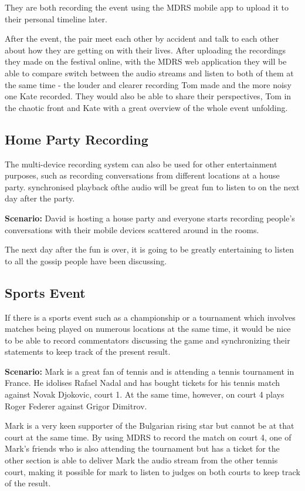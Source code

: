\documentclass{l3proj}
\begin{document}
They are both recording the event using the MDRS mobile app to upload it to their personal timeline later.

After the event, the pair meet each other by accident and talk to each other about how they are getting on with their lives. After uploading the recordings they made on the festival online, with the MDRS web application they will be able to compare switch between the audio streams and listen to both of them at the same time - the louder and clearer recording Tom made and the more noisy one Kate recorded. They would also be able to share their perspectives, Tom in the chaotic front and Kate with a great overview of the whole event unfolding.

\subsection{Home Party Recording} The multi-device recording system can also be used for other entertainment purposes, such as recording conversations from different locations at a house party. synchronised playback ofthe audio will be great fun to listen to on the next day after the party.

\textbf{Scenario:} David is hosting a house party and everyone starts recording people's conversations with their mobile devices scattered around in the rooms.

The next day after the fun is over, it is going to be greatly entertaining to listen to all the gossip people have been discussing.

\subsection{Sports Event} If there is a sports event such as a championship or a tournament which involves matches being played on numerous locations at the same time, it would be nice to be able to record commentators discussing the game and synchronizing their statements to keep track of the present result.

\textbf{Scenario:} Mark is a great fan of tennis and is attending a tennis tournament in France. He idolises Rafael Nadal and has bought tickets for his tennis match against Novak Djokovic, court 1. At the same time, however, on court 4 plays Roger Federer against Grigor Dimitrov.

Mark is a very keen supporter of the Bulgarian rising star but cannot be at that court at the same time. By using MDRS to record the match on court 4, one of Mark's friends who is also attending the tournament but has a ticket for the other section is able to deliver Mark the audio stream from the other tennis court, making it possible for mark to listen to judges on both courts to keep track of the result.
\end{document}
